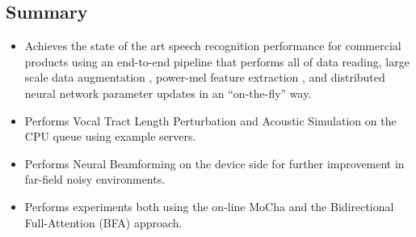 \documentclass[a0,portrait]{a0poster}
\begin{document}
\begin{multicols}{2} %
%
%
%
\large
%
\color{Navy} %
%
%
\color{SaddleBrown} %
%
\section{Summary}
%
\begin{itemize}
\item Achieves the state of the art speech recognition performance for commercial products using an end-to-end pipeline that performs all of data reading,  large scale data augmentation \cite{c_kim_interspeech_2019_00}, power-mel feature extraction \cite{c_kim_asru_2019_00}, and  distributed neural network parameter updates in an “on-the-fly” way.
\item Performs Vocal Tract Length Perturbation and Acoustic Simulation \cite{C_Kim_INTERSPEECH_2017_1} on the CPU queue using example servers.
\item Performs Neural Beamforming \cite{j_heymann_icassp_2016_00} on the device side for further improvement in far-field noisy environments.
\item Performs experiments both using the on-line MoCha \cite{k_kim_asru_2019_00} and the Bidirectional Full-Attention (BFA) approach.
\end{itemize}
%
%
\color{DarkSlateGray} %

\end{multicols}
\end{document}
